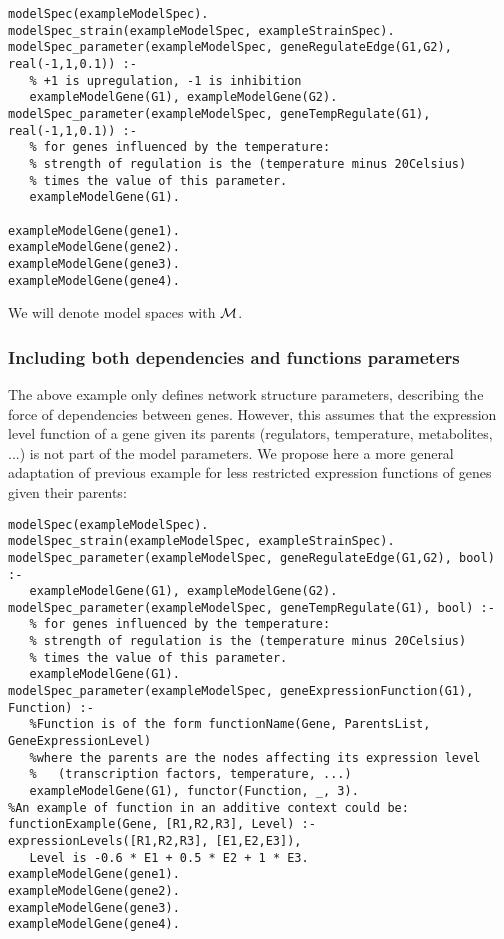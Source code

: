 \documentclass{article}
\begin{document}
\begin{verbatim}
modelSpec(exampleModelSpec).
modelSpec_strain(exampleModelSpec, exampleStrainSpec). 
modelSpec_parameter(exampleModelSpec, geneRegulateEdge(G1,G2), real(-1,1,0.1)) :-
   % +1 is upregulation, -1 is inhibition
   exampleModelGene(G1), exampleModelGene(G2).
modelSpec_parameter(exampleModelSpec, geneTempRegulate(G1), real(-1,1,0.1)) :-
   % for genes influenced by the temperature:
   % strength of regulation is the (temperature minus 20Celsius)
   % times the value of this parameter.
   exampleModelGene(G1).

exampleModelGene(gene1).
exampleModelGene(gene2).
exampleModelGene(gene3).
exampleModelGene(gene4).
\end{verbatim}

We will denote model spaces with $\mathcal{M}$.

\subsubsection{Including both dependencies and functions parameters}
The above example only defines network structure parameters, describing the force of dependencies between genes. However, this assumes that the expression level function of a gene given its parents (regulators, temperature, metabolites, ...) is not part of the model parameters. We propose here a more general adaptation of previous example for less restricted expression functions of genes given their parents:

\begin{verbatim}
modelSpec(exampleModelSpec).
modelSpec_strain(exampleModelSpec, exampleStrainSpec). 
modelSpec_parameter(exampleModelSpec, geneRegulateEdge(G1,G2), bool) :-
   exampleModelGene(G1), exampleModelGene(G2).
modelSpec_parameter(exampleModelSpec, geneTempRegulate(G1), bool) :-
   % for genes influenced by the temperature:
   % strength of regulation is the (temperature minus 20Celsius)
   % times the value of this parameter.
   exampleModelGene(G1).
modelSpec_parameter(exampleModelSpec, geneExpressionFunction(G1), Function) :-
   %Function is of the form functionName(Gene, ParentsList, GeneExpressionLevel) 
   %where the parents are the nodes affecting its expression level
   %   (transcription factors, temperature, ...)
   exampleModelGene(G1), functor(Function, _, 3).
%An example of function in an additive context could be:
functionExample(Gene, [R1,R2,R3], Level) :- expressionLevels([R1,R2,R3], [E1,E2,E3]), 
   Level is -0.6 * E1 + 0.5 * E2 + 1 * E3.
exampleModelGene(gene1).
exampleModelGene(gene2).
exampleModelGene(gene3).
exampleModelGene(gene4).
\end{verbatim}
\end{document}
